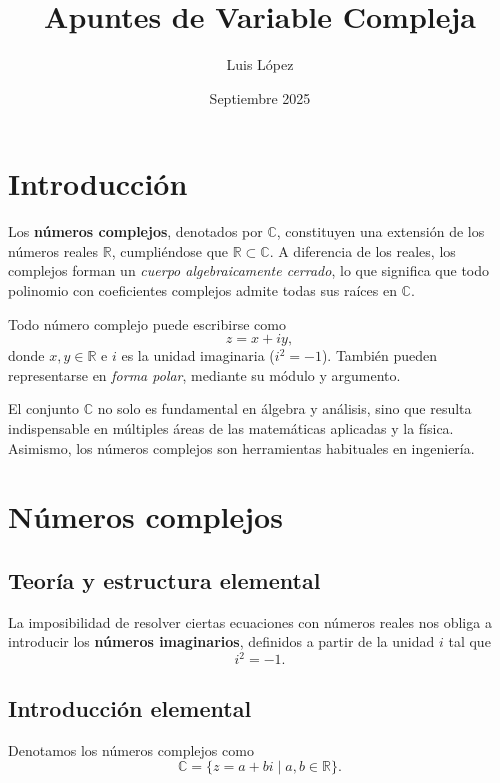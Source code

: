 \documentclass[a4paper,12pt]{article}
\title{Apuntes de Variable Compleja}
\author{Luis López}
\date{Septiembre 2025}
\begin{document}
\maketitle
\clearpage

\tableofcontents
\clearpage

\section*{Introducción}

Los \textbf{números complejos}, denotados por $\mathbb{C}$, constituyen una extensión de los números reales $\mathbb{R}$, cumpliéndose que $\mathbb{R} \subset \mathbb{C}$.
A diferencia de los reales, los complejos forman un \textit{cuerpo algebraicamente cerrado}, lo que significa que todo polinomio con coeficientes complejos admite todas sus raíces en $\mathbb{C}$.

Todo número complejo puede escribirse como
\[
z = x + iy,
\]
donde $x, y \in \mathbb{R}$ e $i$ es la unidad imaginaria ($i^2=-1$).
También pueden representarse en \textit{forma polar}, mediante su módulo y argumento.

El conjunto $\mathbb{C}$ no solo es fundamental en álgebra y análisis, sino que resulta indispensable en múltiples áreas de las matemáticas aplicadas y la física.
Asimismo, los números complejos son herramientas habituales en ingeniería.

\clearpage

\section{Números complejos}

\subsection{Teoría y estructura elemental}

La imposibilidad de resolver ciertas ecuaciones con números reales nos obliga a introducir los
\textbf{números imaginarios}, definidos a partir de la unidad $i$ tal que
\[
    i^2 = -1.
\]

\subsection{Introducción elemental}

Denotamos los números complejos como
\[
    \mathbb{C} = \{ z = a + bi \;|\; a,b \in \mathbb{R} \}.
\]
\end{document}
